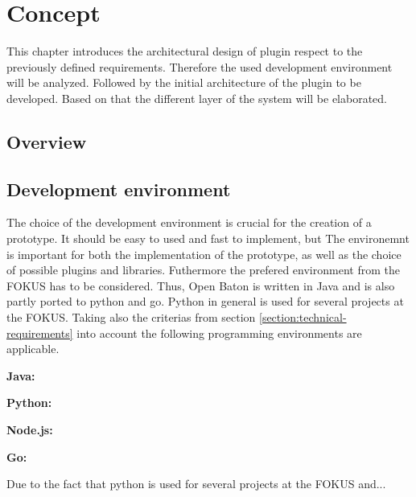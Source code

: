 \acresetall

\chapter{Concept}\label{chapter:concept}
This chapter introduces the architectural design of plugin respect to the previously defined requirements.
Therefore the used development environment will be analyzed.
Followed by the initial architecture of the plugin to be developed.
Based on that the different layer of the system will be elaborated.

\section{Overview}
\doit


\section{Development environment}
The choice of the development environment is crucial for the creation of a prototype.
It should be easy to used and fast to implement, but
The environemnt is important for both the implementation of the prototype, as well as the choice of possible plugins and libraries.
Futhermore the prefered environment from the \ac{FOKUS} has to be considered.
Thus, Open Baton is written in Java and is also partly ported to python and go.
Python in general is used for several projects at the \ac{FOKUS}.
Taking also the criterias from section \ref{section:technical-requirements} into account the following programming environments are applicable.
\doit

\textbf{Java:}

\textbf{Python:}

\textbf{Node.js:}

\textbf{Go:}

Due to the fact that python is used for several projects at the \ac{FOKUS} and... %

